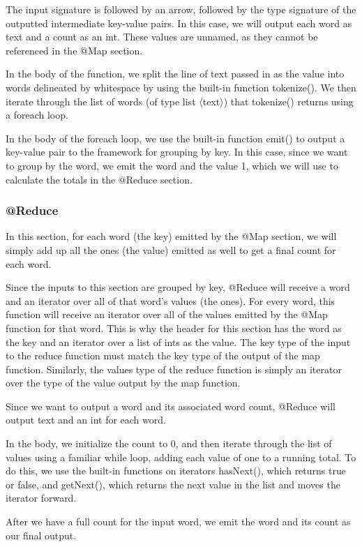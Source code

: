 \documentclass{article}
\begin{document}
The input signature is followed by an arrow, followed by the type signature of the outputted intermediate key-value pairs. In this case, we will output each word as text and a count as an int. These values are unnamed, as they cannot be referenced in the @Map section.

In the body of the function, we split the line of text passed in as the value into words delineated by whitespace by using the built-in function tokenize(). We then iterate through the list of words (of type list $\langle$text$\rangle$) that tokenize() returns using a foreach loop. 

In the body of the foreach loop, we use the built-in function emit() to output a key-value pair to the framework for grouping by key. In this case, since we want to group by the word, we emit the word and the value 1, which we will use to calculate the totals in the @Reduce section.

\subsubsection*{@Reduce}
In this section, for each word (the key) emitted by the @Map section, we will simply add up all the ones (the value) emitted as well to get a final count for each word. 

Since the inputs to this section are grouped by key, @Reduce will receive a word and an iterator over all of that word's values (the ones). For every word, this function will receive an iterator over all of the values emitted by the @Map function for that word. This is why the header for this section has the word as the key and an iterator over a list of ints as the value. The key type of the input to the reduce function must match the key type of the output of the map function. Similarly, the values type of the reduce function is simply an iterator over the type of the value output by the map function.

Since we want to output a word and its associated word count, @Reduce will output text and an int for each word.

In the body, we initialize the count to 0, and then iterate through the list of values using a familiar while loop, adding each value of one to a running total. To do this, we use the built-in functions on iterators hasNext(), which returns true or false, and getNext(), which returns the next value in the list and moves the iterator forward. 

After we have a full count for the input word, we emit the word and its count as our final output.
\end{document}
